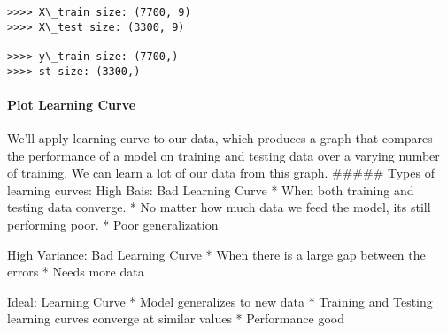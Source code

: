 \documentclass[11pt]{article}
\begin{document}
    \begin{Verbatim}[commandchars=\\\{\}]
>>>> X\_train size: (7700, 9)
>>>> X\_test size: (3300, 9)

>>>> y\_train size: (7700,)
>>>> st size: (3300,)

    \end{Verbatim}

    \hypertarget{plot-learning-curve}{%
\paragraph{Plot Learning Curve}\label{plot-learning-curve}}

We'll apply learning curve to our data, which produces a graph that
compares the performance of a model on training and testing data over a
varying number of training. We can learn a lot of our data from this
graph. \#\#\#\#\# Types of learning curves: High Bais: Bad Learning
Curve * When both training and testing data converge. * No matter how
much data we feed the model, its still performing poor. * Poor
generalization

High Variance: Bad Learning Curve * When there is a large gap between
the errors * Needs more data

Ideal: Learning Curve * Model generalizes to new data * Training and
Testing learning curves converge at similar values * Performance good
\end{document}
